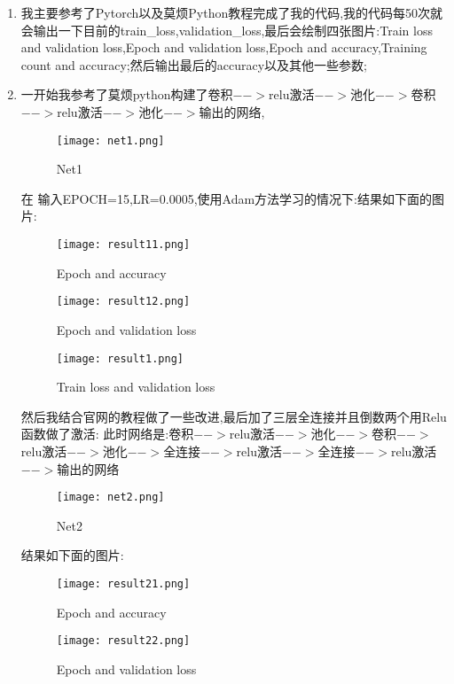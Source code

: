 \documentclass[11pt, a4paper, UTF8]{ctexart}
\begin{document}
\begin{solution}
   \begin{enumerate}
   	\item 我主要参考了Pytorch以及莫烦Python教程完成了我的代码,我的代码每50次就会输出一下目前的train\_loss,validation\_loss,最后会绘制四张图片:Train loss and validation loss,Epoch and validation loss,Epoch and accuracy,Training count and accuracy;然后输出最后的accuracy以及其他一些参数;
   	\item 一开始我参考了莫烦python构建了卷积$-->$relu激活$-->$池化$-->$卷积$-->$relu激活$-->$池化$-->$输出的网络,
   	\begin{figure}[htbp] 
   		\centering
   		\texttt{[image: net1.png]}
   		\caption{Net1}
   	\end{figure} 
   在 输入EPOCH=15,LR=0.0005,使用Adam方法学习的情况下:结果如下面的图片:
      	\begin{figure}[htbp] 
   	\centering
   	\texttt{[image: result11.png]}
   	\caption{Epoch and accuracy}
   \end{figure} 
   	\begin{figure}[htbp] 
	\centering
	\texttt{[image: result12.png]}
	\caption{Epoch and validation loss}
\end{figure} 
   
   	\begin{figure}[htbp] 
   	\centering
   	\texttt{[image: result1.png]}
   	\caption{Train loss and validation loss}
   \end{figure} 
   
  \newpage 
  然后我结合官网的教程做了一些改进,最后加了三层全连接并且倒数两个用Relu函数做了激活:
  此时网络是:卷积$-->$relu激活$-->$池化$-->$卷积$-->$relu激活$-->$池化$-->$全连接$-->$relu激活$-->$全连接$-->$relu激活$-->$输出的网络
      	\begin{figure}[htbp] 
   	\centering
   	\texttt{[image: net2.png]}
   	\caption{Net2}
   \end{figure} 

结果如下面的图片:
 	\begin{figure}[htbp] 
	\centering
	\texttt{[image: result21.png]}
	\caption{Epoch and accuracy}
\end{figure} 
\begin{figure}[htbp] 
	\centering
	\texttt{[image: result22.png]}
	\caption{Epoch and validation loss}
\end{figure} 


\end{enumerate}
\end{solution}
\end{document}
